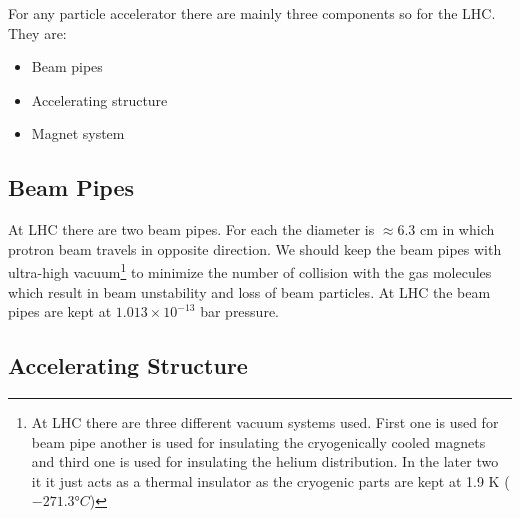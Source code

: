 For any particle accelerator there are mainly three components so for the LHC. They are:
\begin{itemize}
  \item Beam pipes
  \item Accelerating structure
  \item Magnet system
\end{itemize}

\subsection{Beam Pipes}
At LHC there are two beam pipes. For each the diameter is $\approx$6.3 cm in which protron beam travels in opposite direction. We should keep the beam pipes with ultra-high vacuum\footnote{At LHC there are three different vacuum systems used. First one is used for beam pipe another is used for insulating the cryogenically cooled magnets and third one is used for insulating the helium distribution. In the later two it it just acts as a thermal insulator as the cryogenic parts are kept at 1.9 K ($\ang{-271.3}C$)} to minimize the number of collision with the gas molecules which result in beam unstability and loss of beam particles. At LHC the beam pipes are kept at $1.013 \times 10^{-13}$ bar pressure.

\subsection{Accelerating Structure}

